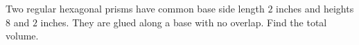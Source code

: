 Two regular hexagonal prisms have common base side length $2$ inches and heights $8$ and $2$ inches. They are glued along a base with no overlap. Find the total volume.
